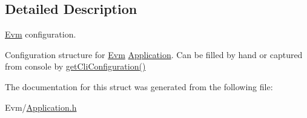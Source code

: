 \subsection{Detailed Description}
\mbox{\hyperlink{namespace_evm}{Evm}} configuration. 

Configuration structure for \mbox{\hyperlink{namespace_evm}{Evm}} \mbox{\hyperlink{struct_evm_1_1_application}{Application}}. Can be filled by hand or captured from console by \mbox{\hyperlink{namespace_evm_aa2edd047bba5bfc0fd7bdf9d49538c16}{get\+Cli\+Configuration()}} 

The documentation for this struct was generated from the following file\+:\begin{DoxyCompactItemize}
\item 
Evm/\mbox{\hyperlink{_application_8h}{Application.\+h}}\end{DoxyCompactItemize}
